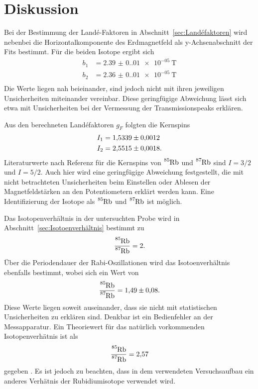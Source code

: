 \section{Diskussion}
\label{sec:Diskussion}
Bei der Bestimmung der Landé-Faktoren in Abschnitt~\ref{sec:Landéfaktoren} wird nebenbei die Horizontalkomponente des Erdmagnetfeld als y-Achsenabschnitt der
Fits bestimmt. Für die beiden Isotope ergibt sich
\begin{align*}
    b_1 &= \qty{2.39(0.01)e-05}{\tesla} \\
    b_2 &= \qty{2.36(0.01)e-05}{\tesla} \\
\end{align*}
Die Werte liegen nah beieinander, sind jedoch nicht mit ihren jeweiligen Unsicherheiten miteinander vereinbar. Diese geringfügige Abweichung lässt sich etwa mit
Unsicherheiten bei der Vermessung der Transmissionspeaks erklären.

Aus den berechneten Landéfaktoren $g_F$ folgten die Kernspins
\begin{align*}
    I_1 &= \num{1.5339+-0.0012} \\
    I_2 &= \num{2.5515+-0.0018}.
  \end{align*}
Literaturwerte nach Referenz \cite{Rubidium} für die Kernspins von $\ce{^{85}Rb}$ und $\ce{^{87}Rb}$ sind $I=3/2$ und $I=5/2$. Auch hier wird eine geringfügige
Abweichung festgestellt, die mit nicht betrachteten Unsicherheiten beim Einstellen oder Ablesen der Magnetfeldstärken an den Potentiometern erklärt werden kann.
Eine Identifizierung der Isotope als $\ce{^{85}Rb}$ und $\ce{^{87}Rb}$ ist möglich.

Das Isotopenverhältnis in der untersuchten Probe wird in Abschnitt~\ref{sec:Isotoenverhältnis} bestimmt zu
\begin{equation*}
    \frac{\ce{^{85}Rb}}{\ce{^{87}Rb}} = \num{2}.
  \end{equation*}
Über die Periodendauer der Rabi-Oszillationen wird das Isotoenverhältnis ebenfalls bestimmt, wobei sich ein Wert von
\begin{equation*}
    \frac{\ce{^{85}Rb}}{\ce{^{87}Rb}} = \num{1.49+-0.08}.
  \end{equation*}
Diese Werte liegen soweit auseinander, dass sie nicht mit statistischen Unsicherheiten zu erklären sind. Denkbar ist ein Bedienfehler an der Messapparatur.
Ein Theoriewert für das natürlich vorkommenden Isotopenverhätnis ist als
\begin{equation*}
    \frac{\ce{^{85}Rb}}{\ce{^{87}Rb}} = \num{2.57}
  \end{equation*}
gegeben \cite{Rubidium}. Es ist jedoch zu beachten, dass in dem verwendeten Versuchsaufbau ein anderes Verhätnis der Rubidiumisotope verwendet wird.
